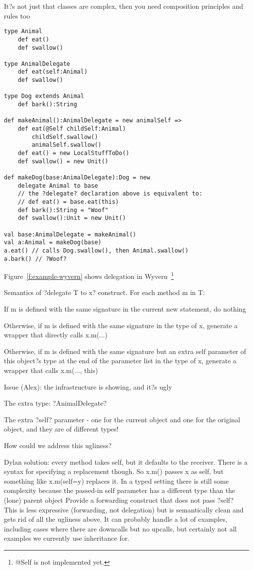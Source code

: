 \documentclass[preprint]{sigplanconf}
\begin{document}
It?s not just that classes are complex, then you need composition principles and rules too

\begin{figure*}
\begin{lstlisting}
type Animal
	def eat()
	def swallow()

type AnimalDelegate
	def eat(self:Animal)
	def swallow()

type Dog extends Animal
	def bark():String

def makeAnimal():AnimalDelegate = new animalSelf =>
	def eat(@Self childSelf:Animal)
		childSelf.swallow()
		animalSelf.swallow()
	def eat() = new LocalStuffToDo()
	def swallow() = new Unit()

def makeDog(base:AnimalDelegate):Dog = new
	delegate Animal to base
	// the ?delegate? declaration above is equivalent to:
	// def eat() = base.eat(this)
	def bark():String = "Woof"
	def swallow():Unit = new Unit()

val base:AnimalDelegate = makeAnimal()
val a:Animal = makeDog(base)
a.eat() // calls Dog.swallow(), then Animal.swallow()
a.bark() // ?Woof?
\end{lstlisting}
\caption{Example of Delegation in Wyvern}
\label{f:example-wyvern}
\end{figure*}

Figure~\ref{f:example-wyvern} shows delegation in Wyvern~\footnote{@Self is not implemented yet.}

Semantics of ?delegate T to x? construct.  For each method m in T:

If m is defined with the same signature in the current new statement, do nothing

Otherwise, if m is defined with the same signature in the type of x, generate a wrapper that directly calls x.m(...)

Otherwise, if m is defined with the same signature but an extra self parameter of this object?s type at the end of the parameter list in the type of x, generate a wrapper that calls x.m(..., this)


Issue (Alex): the infrastructure is showing, and it?s ugly

The extra type: ?AnimalDelegate?

The extra ?self? parameter - one for the current object and one for the original object, and they are of different types!


How could we address this ugliness?

Dylan solution: every method takes self, but it defaults to the receiver.  There is a syntax for specifying a replacement though.  So x.m() passes x as self, but something like x.m(self=y) replaces it.  In a typed setting there is still some complexity because the passed-in self parameter has a different type than the (lone) parent object
Provide a forwarding construct that does not pass ?self?  This is less expressive (forwarding, not delegation) but is semantically clean and gets rid of all the ugliness above.  It can probably handle a lot of examples, including cases where there are downcalls but no upcalls, but certainly not all examples we currently use inheritance for.
\end{document}
